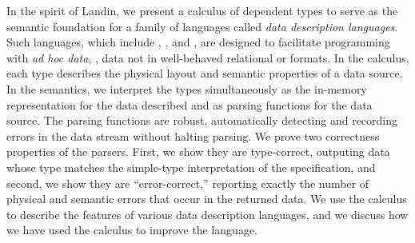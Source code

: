 In the spirit of Landin, we present a calculus of dependent types to serve as the semantic foundation for a family of languages called \textit{data description languages}.  Such languages, which include \pads{}, \datascript{}, and \packettypes{}, are designed to facilitate programming with \textit{ad hoc data}, \ie{}, data not in well-behaved relational or \xml{} formats.   
In the calculus, each type describes the physical layout and semantic properties of a data source. In the semantics, we interpret the types simultaneously as the in-memory representation for the data described and as parsing functions for the data source. The parsing functions are robust, automatically detecting and recording errors in the data stream without halting parsing.  We prove two correctness properties of the parsers.  First, we show they are type-correct, outputing data whose type matches the simple-type interpretation of the specification, and second, we show they are ``error-correct,'' reporting exactly the number of physical and semantic errors that occur in the returned data.  We use the calculus to describe the features of various data description languages, and we discuss how we have used the calculus to improve the \pads{} language.  

